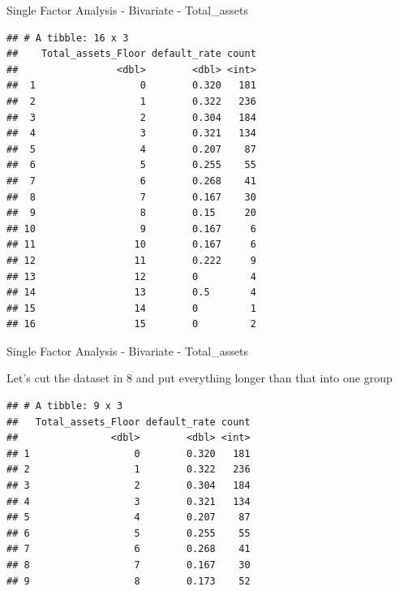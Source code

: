 \documentclass[9pt,ignorenonframetext,]{beamer}
\begin{document}
\begin{frame}[fragile]{Single Factor Analysis - Bivariate -
Total\_assets}

\begin{verbatim}
## # A tibble: 16 x 3
##    Total_assets_Floor default_rate count
##                 <dbl>        <dbl> <int>
##  1                  0        0.320   181
##  2                  1        0.322   236
##  3                  2        0.304   184
##  4                  3        0.321   134
##  5                  4        0.207    87
##  6                  5        0.255    55
##  7                  6        0.268    41
##  8                  7        0.167    30
##  9                  8        0.15     20
## 10                  9        0.167     6
## 11                 10        0.167     6
## 12                 11        0.222     9
## 13                 12        0         4
## 14                 13        0.5       4
## 15                 14        0         1
## 16                 15        0         2
\end{verbatim}

\end{frame}

\begin{frame}[fragile]{Single Factor Analysis - Bivariate -
Total\_assets}

Let's cut the dataset in 8 and put everything longer than that into one
group

\begin{verbatim}
## # A tibble: 9 x 3
##   Total_assets_Floor default_rate count
##                <dbl>        <dbl> <int>
## 1                  0        0.320   181
## 2                  1        0.322   236
## 3                  2        0.304   184
## 4                  3        0.321   134
## 5                  4        0.207    87
## 6                  5        0.255    55
## 7                  6        0.268    41
## 8                  7        0.167    30
## 9                  8        0.173    52
\end{verbatim}

\end{frame}
\end{document}

